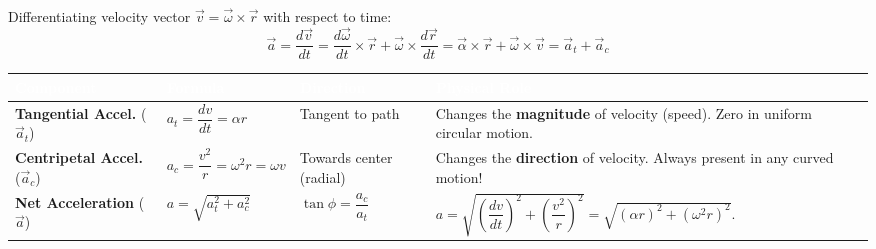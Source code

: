 \documentclass[11pt,a4paper]{article}
\begin{document}
\vspace{5pt}
\noindent{\large\textbf{\textsf{\textcolor{primaryDark}{2.2 Acceleration Decomposition in Circular Motion}}}}\\[3pt]
Differentiating velocity vector $\vec{v} = \vec{\omega}\times\vec{r}$ with respect to time:
\[
  \vec{a} = \frac{d\vec{v}}{dt} = \frac{d\vec{\omega}}{dt}\times\vec{r} + \vec{\omega}\times\frac{d\vec{r}}{dt} = \vec{\alpha}\times\vec{r} + \vec{\omega}\times\vec{v} = \vec{a}_t + \vec{a}_c
\]
\begin{center}
\renewcommand{\arraystretch}{1.25}
\small
\begin{tabularx}{\linewidth}{|>{\raggedright\arraybackslash}m{3.2cm}|>{\centering\arraybackslash}m{3.0cm}|>{\centering\arraybackslash}m{3.2cm}|>{\raggedright\arraybackslash}X|}
\hline
\rowcolor{tableDarkHeader}
\textcolor{white}{\textbf{Component}} & \textcolor{white}{\textbf{Formula}} & \textcolor{white}{\textbf{Direction}} & \textcolor{white}{\textbf{Physical Role}} \\
\hline
\rowcolor{white}
\textbf{Tangential Accel.} ($\vec{a}_t$) & $a_t = \dfrac{dv}{dt} = \alpha r$ & Tangent to path & Changes the \textbf{magnitude} of velocity (speed). Zero in uniform circular motion. \\
\hline
\rowcolor{tableStripe}
\textbf{Centripetal Accel.} ($\vec{a}_c$) & $a_c = \dfrac{v^2}{r} = \omega^2 r = \omega v$ & Towards center (radial) & Changes the \textbf{direction} of velocity. Always present in any curved motion! \\
\hline
\rowcolor{white}
\textbf{Net Acceleration} ($\vec{a}$) & $a = \sqrt{a_t^2 + a_c^2}$ & $\tan\phi = \dfrac{a_c}{a_t}$ & $a = \sqrt{\left(\dfrac{dv}{dt}\right)^2 + \left(\dfrac{v^2}{r}\right)^2} = \sqrt{(\alpha r)^2 + (\omega^2 r)^2}$. \\
\hline
\end{tabularx}
\end{center}
\end{document}
